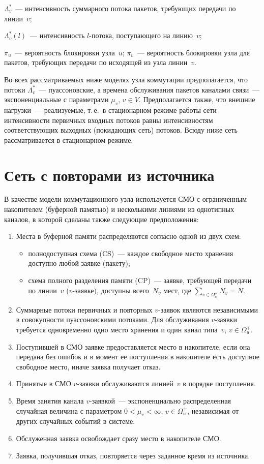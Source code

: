 \begin{multicols}{2}
     \noindent
     $\Lambda_v^*$~--- интенсивность суммарного потока пакетов, 
требующих передачи по линии~$v$;
     
     \noindent
     $\Lambda_v^*(l)$~--- интенсивность $l$-потока, поступающего на 
линию~$v$;
     
     \noindent
     $\pi_u$~--- вероятность блокировки узла~$u$;
     $\pi_v$~--- вероятность блокировки узла для пакетов, требующих 
передачи по исходящей из узла линии~$v$.
     
     Во всех рассматриваемых ниже моделях узла коммутации 
предполагается, что потоки $\Lambda_v^*$~--- пуассоновские, а времена 
обслуживания пакетов каналами связи~--- экспоненциальные с параметрами 
$\mu_v$, $v\in V$. Предполагается также, что внешние нагрузки~--- 
реализуемые, т.\,е.\ в стационарном режиме работы сети интенсивности 
первичных входных потоков равны интенсивностям соответствующих 
выходных (покидающих сеть) потоков. Всюду ниже сеть рассматривается в 
стационарном режиме.
     
\section{Сеть с повторами из источника}
     
     В качестве модели коммутационного узла используется СМО с 
ограниченным накопителем (буферной памятью) и несколькими линиями из 
однотипных каналов, в которой сделаны также следующие предположения:
     \begin{enumerate}[1.]
\item Места в буферной памяти распределяются согласно одной из двух 
схем:
\begin{itemize}
\item полнодоступная схема (CS)~--- каждое свободное место хранения 
доступно любой заявке (пакету);
\item схема полного разделения памяти (CP)~--- заявке, требующей передачи 
по линии~$v$ ($v$-заявке), доступны всего~$N_v$ мест, где 
$\sum\limits_{v\in\Omega_u^+} N_v = N$.
\end{itemize}
\item Суммарные потоки первичных и повторных $v$-заявок являются 
независимыми в совокупности пуассоновскими потоками. Для 
обслуживания $v$-заявки требуется одновременно одно место хранения и 
один канал типа~$v$, $v\in\Omega_u^+$.
\item Поступившей в СМО заявке предоставляется место в накопителе, если 
она передана без ошибок и в момент ее поступления в накопителе есть 
доступное свободное место, иначе заявка получает отказ.
\item Принятые в СМО $v$-заявки обслуживаются линией~$v$ в порядке 
поступления.
\item Время занятия канала $v$-заявкой~--- экспоненциально 
распределенная случайная величина с параметром $0<\mu_v<\infty$, $v\in 
\Omega_u^+$, независимая от других случайных событий в системе.
\item Обслуженная заявка освобождает сразу место в накопителе СМО.
\item Заявка, получившая отказ, повторяется через заданное время из 
источника.
\end{enumerate}


\end{multicols}
